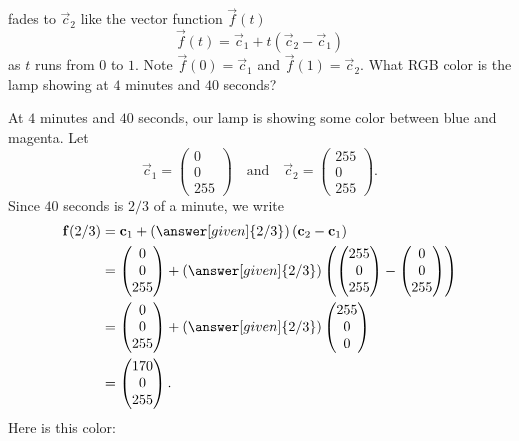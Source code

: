 \documentclass{ximera}
\begin{document}
\begin{example}
  fades to $\vec{c}_2$ like the vector function $\vec{f}(t)$
  \[
  \vec{f}(t) = \vec{c}_1+ t(\vec{c}_2 -\vec{c}_1)
  \]
  as $t$ runs from $0$ to $1$. Note $\vec{f}(0) = \vec{c}_1$ and
  $\vec{f}(1) = \vec{c}_2$.  What RGB color is the lamp showing at $4$
  minutes and $40$ seconds?
  \begin{explanation}
    At $4$ minutes and $40$ seconds, our lamp is showing some color
    between blue and magenta. Let
    \[
      \vec{c}_1 = \begin{pmatrix}0\\0\\255\end{pmatrix} \quad\text{and}\quad
      \vec{c}_2 = \begin{pmatrix}255\\0\\255\end{pmatrix}.
    \]
    Since $40$ seconds is $2/3$ of a minute, we write
    \begin{align*}
      \vec{f}(2/3) &= \vec{c}_{1}+ \left(\answer[given]{2/3}\right)(\vec{c}_2 -\vec{c}_1) \\
      &= \begin{pmatrix}0\\0\\255\end{pmatrix}+ \left(\answer[given]{2/3}\right)\left(\begin{pmatrix}255\\0\\255\end{pmatrix}  -  \begin{pmatrix}0\\0\\255\end{pmatrix}\right) \\
      &=\begin{pmatrix}0\\0\\255\end{pmatrix}+ \left(\answer[given]{2/3}\right)\begin{pmatrix}255\\0\\0\end{pmatrix} \\
                &=\begin{pmatrix}170\\0\\255\end{pmatrix}.
    \end{align*}
    Here is this color:
    \begin{center}
    \colorbox[RGB]{170,0, 255}{
      \parbox{1cm}{\rule{0pt}{1cm}}}
  \end{center}
  \end{explanation}
\end{example}
\end{document}
